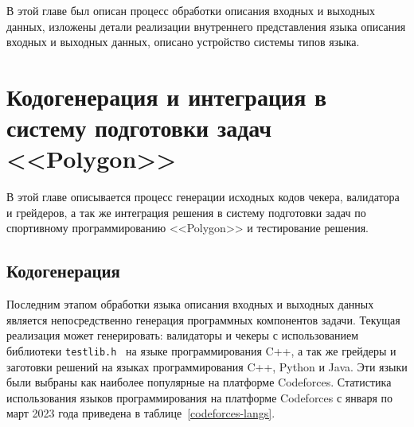 \documentclass[times,specification,annotation]{style/itmo-student-thesis/itmo-student-thesis}
\begin{document}
\chapterconclusion

В этой главе был описан процесс обработки описания входных и выходных данных, изложены детали реализации внутреннего представления языка описания входных и выходных данных, описано устройство системы типов языка.

\chapter{Кодогенерация и интеграция в систему подготовки задач <<Polygon>>}

В этой главе описывается процесс генерации исходных кодов чекера, валидатора и грейдеров, а так же интеграция решения в систему подготовки задач по спортивному программированию <<Polygon>> и тестирование решения.

\section{Кодогенерация}

Последним этапом обработки языка описания входных и выходных данных является непосредственно генерация программных компонентов задачи. Текущая реализация может генерировать: валидаторы и чекеры с использованием библиотеки \texttt{testlib.h}~\cite{cf-testlib} на языке программирования C++, а так же грейдеры и заготовки решений на языках программирования C++, Python и Java. Эти языки были выбраны как наиболее популярные на платформе Codeforces. Статистика использования языков программирования на платформе Codeforces с января по март 2023 года приведена в таблице~\ref{codeforces-langs}.
\end{document}

